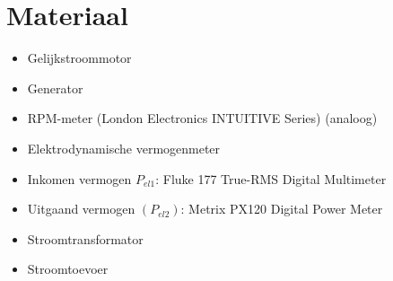 \section{Materiaal}
\begin{itemize}
    \item Gelijkstroommotor
    \item Generator
    \item RPM-meter (London Electronics INTUITIVE Series) (analoog)
    \item Elektrodynamische vermogenmeter
    \item Inkomen vermogen $P_{el1}$: Fluke 177 True-RMS Digital Multimeter
    \item Uitgaand vermogen $(P_{el2})$: Metrix PX120 Digital Power Meter
    \item Stroomtransformator
    \item Stroomtoevoer
\end{itemize}
